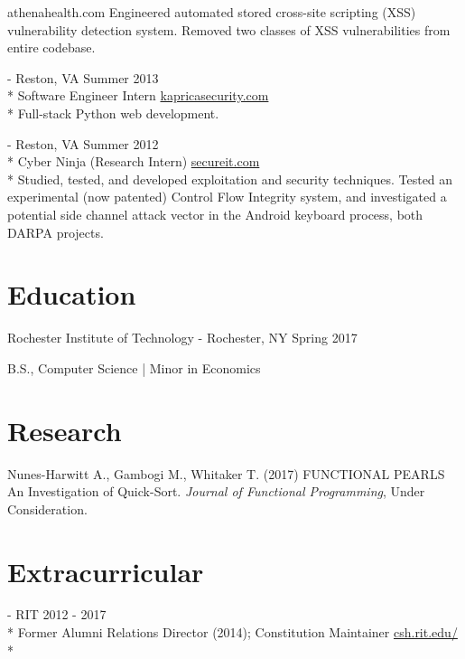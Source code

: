 \documentclass[letter,margin,line]{resume}
\newcommand{\rurl}[1]{\hfill {\footnotesize \url{#1}}}
\newcommand{\rdate}[1]{\hfill {\small #1}}
\renewcommand{\employer}[6]{\item[#1] - #2 \rdate{#3} \\* #4 \rurl{#5}\\* #6}
\begin{document}
\begin{resume}
\begin{asparadesc}
                     {athenahealth.com}
                     {
                         Engineered automated stored cross-site scripting (XSS) vulnerability detection system.
                        Removed two classes of XSS vulnerabilities from entire codebase.
                     }\\
            \employer{Kaprica Security}
                     {Reston, VA}
                     {Summer 2013}
                     {Software Engineer Intern}
                     {kapricasecurity.com}
                     {
                         Full-stack Python web development.
                     }\\
            \employer{SecureIT}
                     {Reston, VA}
                     {Summer 2012}
                     {Cyber Ninja (Research Intern)}
                     {secureit.com}
                     {
                      Studied, tested, and developed exploitation and security techniques.
                      Tested an experimental (now patented)
                      Control Flow Integrity system, and 
                      investigated a potential side channel attack vector
                      in the Android keyboard process, both DARPA projects.
                     }
        \end{asparadesc}

        \section{\mysidestyle Education}
        \begin{compactdesc}
        \item[Rochester Institute of Technology] - Rochester, NY
            \rdate{Spring 2017}
        \item B.S., Computer Science | Minor in Economics
        \end{compactdesc}

        \section{\mysidestyle Research}
        \begin{compactdesc}
        \item Nunes-Harwitt A., Gambogi M., Whitaker T. (2017) FUNCTIONAL PEARLS An Investigation of Quick-Sort.
              \textit{Journal of Functional Programming}, Under Consideration.
        \end{compactdesc}

        \section{\mysidestyle Extracurricular}
        \begin{asparadesc}
            \employer{Computer Science House}
                     {RIT}
                     {2012 - 2017}
                     {Former Alumni Relations Director (2014); Constitution Maintainer}
                     {csh.rit.edu/}
                     {}
        \end{asparadesc}


\end{resume}
\end{document}
